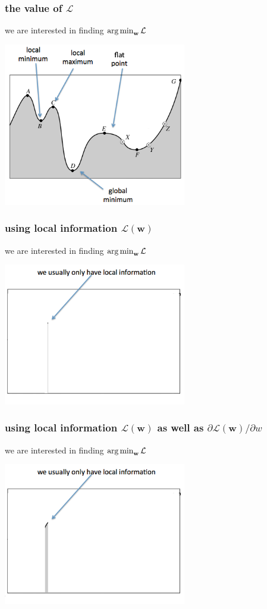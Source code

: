 \documentclass[USenglish,pdftex,compress,10pt,svgnamesi,handout]{beamer}
\def\Vec#1{\textbf{#1}}
\begin{document}
\begin{frame}
\frametitle{the value of $\mathcal L$}
we are interested in finding $\argmin_{\Vec w} \mathcal L$

\includegraphics[width=8cm]{pics/optimise1.png}

\end{frame}


\begin{frame}
\frametitle{using local information $\mathcal L(\Vec w)$}
we are interested in finding $\argmin_{\Vec w} \mathcal L$ 


\includegraphics[width=8cm]{pics/optimise2l.png}
\end{frame}


\begin{frame}
\frametitle{using local information $\mathcal L(\Vec w)$ as well as $\partial \mathcal L(\Vec w)/\partial w$}
we are interested in finding $\argmin_{\Vec w} \mathcal L$ 


\includegraphics[width=8cm]{pics/optimise2.png}

\end{frame}
\end{document}

